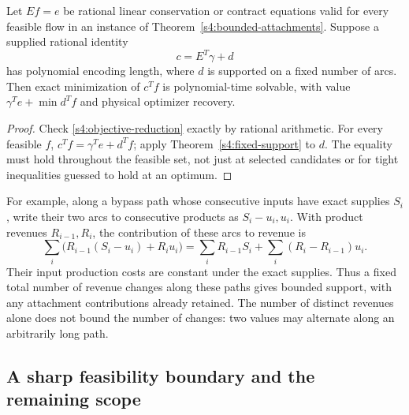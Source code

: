 \begin{corollary}
\label{s4:equality-support}
Let $Ef=e$ be rational linear conservation or contract equations
valid for every feasible flow in an instance of
Theorem~\ref{s4:bounded-attachments}. Suppose a supplied rational
identity
\begin{equation}
 c=E^T\gamma+d\label{s4:objective-reduction}
\end{equation}
has polynomial encoding length, where $d$ is supported on a fixed
number of arcs. Then exact minimization of $c^Tf$ is polynomial-time
solvable, with value $\gamma^Te+\min d^Tf$ and physical optimizer
recovery.
\end{corollary}
\begin{proof}
Check \eqref{s4:objective-reduction} exactly by rational arithmetic.
For every feasible $f$, $c^Tf=\gamma^Te+d^Tf$; apply
Theorem~\ref{s4:fixed-support} to $d$. The equality must hold throughout
the feasible set, not just at selected candidates or for tight
inequalities guessed to hold at an optimum.
\end{proof}

For example, along a bypass path whose consecutive inputs have exact
supplies $S_i$, write their two arcs to consecutive products as
$S_i-u_i,u_i$. With product revenues $R_{i-1},R_i$, the contribution
of these arcs to revenue is
\begin{equation}
 \sum_i\bigl(R_{i-1}(S_i-u_i)+R_i u_i\bigr)
 =\sum_iR_{i-1}S_i+\sum_i(R_i-R_{i-1})u_i.
 \label{s4:price-changes}
\end{equation}
Their input production costs are constant under the exact supplies.
Thus a fixed total number of revenue changes along these paths gives
bounded support, with any attachment contributions already retained.
The number of distinct revenues alone does not bound the number of
changes: two values may alternate along an arbitrarily long path.

\subsection{A sharp feasibility boundary and the remaining scope}
\label{s4:scope}

